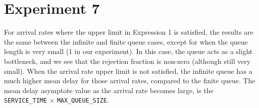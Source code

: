\section*{Experiment 7}
For arrival rates where the upper limit in Expression 1 is satisfied, the results are the same between the infinite and finite queue cases, except for when the queue length is very small (1 in our experiment).
In this case, the queue acts as a slight bottleneck, and we see that the rejection fraction is non-zero (although still very small).
When the arrival rate upper limit is not satisfied, the infinite queue has a much higher mean delay for those arrival rates, compared to the finite queue.
The mean delay asymptote value as the arrival rate becomes large, is the \texttt{SERVICE\_TIME} $\times$ \texttt{MAX\_QUEUE\_SIZE}.

